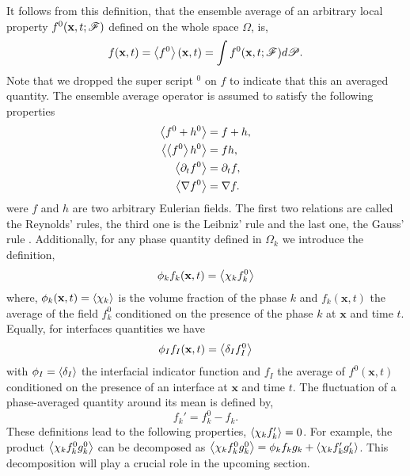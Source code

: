 It follows from this definition, that the ensemble average of an arbitrary local property $f^0(\textbf{x},t;\mathscr{F})$ defined on the whole space $\Omega$, is,
\begin{equation}
    f(\textbf{x},t)
    = \left<f^0\right>(\textbf{x},t)
    =\int f^0(\textbf{x},t;\mathscr{F}) d\mathscr{P}. 
    \label{eq:avg}
\end{equation}  
Note that we dropped the super script $^0$ on $f$ to indicate that this an averaged quantity. 
The ensemble average operator is assumed to satisfy the following properties \citep{drew1983mathematical}
\begin{align}
    \left<f^0+h^0\right> &= f+h, \\ 
    \left<\left<f^0\right>h^0\right> &= fh, \\
    \left<\partial_t f^0\right> 
    &= \partial_t f, \\ 
    \left<\mathbf{\nabla} f^0\right>
    &= \mathbf{\nabla} f. 
    \label{eq:avg_properties}
\end{align}
were $f$ and $h$ are two arbitrary Eulerian fields. The first two relations are called the Reynolds' rules, the third one is the Leibniz' rule and the last one, the Gauss' rule \citep{drew1983mathematical}.
Additionally, for any phase quantity defined in $\Omega_k$ we introduce the definition, 
\begin{equation}
    \phi_k f_k (\textbf{x},t) = \left<\chi_k f_k^0\right>
    \label{eq:1_avg}
\end{equation}
where, $\phi_k(\textbf{x},t) = \left<\chi_k\right>$ is the volume fraction of the phase $k$
and $f_k(\textbf{x},t)$ the average of the field $f_k^0$ conditioned on the presence of the phase $k$ at $\textbf{x}$ and time $t$.
Equally, for interfaces quantities we have 
\begin{equation}
    \phi_I f_I (\textbf{x},t) = \left<\delta_I f_I^0\right>
\end{equation}
with $\phi_I = \left<\delta_I\right>$ the interfacial indicator function and $f_I$ the average of $f^0(\textbf{x},t)$ conditioned on the presence of an interface at $\textbf{x}$ and time $t$. 
The fluctuation of a phase-averaged quantity around its mean is defined by,
\begin{equation}
    f_k' = f_k^0 - f_k.
    \label{eq:def_fluctu}
\end{equation}
These definitions lead to the following properties, $\left<\chi_k f'_k\right> = 0$. 
For example, the product $\left<\chi_k f^0_kg^0_k\right>$ can be decomposed as $\left<\chi_k f_k^0g_k^0\right>=\phi_k f_kg_k + \left<\chi_k f'_kg'_k\right>$. 
This decomposition will play a crucial role in the upcoming section. 

